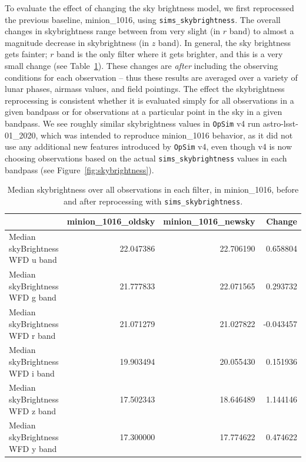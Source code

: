 \documentclass[DM,lsstdraft,authoryear,toc]{lsstdoc}
\newcommand{\opsim}{\texttt{OpSim}\xspace}
\newcommand{\simsky}{\texttt{sims\_skybrightness}\xspace}
\begin{document}

To evaluate the effect of changing the sky brightness model, we first reprocessed the previous baseline, minion\_1016, using \simsky. The overall changes in skybrightness range between from very slight (in $r$ band) to almost a magnitude decrease in skybrightness (in $z$ band). In general, the sky brightness gets fainter; $r$ band is the only filter where it gets brighter, and this is a very small change (see Table~\ref{tab:medskybright}). These changes are {\it after} including the observing conditions for each observation -- thus these results are averaged over a variety of lunar phases, airmass values, and field pointings. The effect the skybrightness reprocessing is consistent whether it is evaluated simply for all observations in a given bandpass or  for observations at a particular point in the sky in a given bandpass. We see roughly similar skybrightness values in \opsim v4 run astro-lsst-01\_2020, which was intended to reproduce minion\_1016 behavior, as it did not use any additional new features introduced by \opsim v4, even though v4 is now choosing observations based on the actual \simsky values in each bandpass (see Figure~\ref{fig:skybrightness}). 

\begin{table}[htp]
\caption{Median skybrightness over all observations in each filter, in minion\_1016, before and after reprocessing with \simsky.}
\begin{center}
\begin{tabular}{lrrr}
{} &  minion\_1016\_oldsky &  minion\_1016\_newsky &    Change \\
\hline
Median skyBrightness WFD u band       &           22.047386 &           22.706190 &  0.658804 \\
Median skyBrightness WFD g band       &           21.777833 &           22.071565 &  0.293732 \\
Median skyBrightness WFD r band       &           21.071279 &           21.027822 & -0.043457 \\
Median skyBrightness WFD i band       &           19.903494 &           20.055430 &  0.151936 \\
Median skyBrightness WFD z band       &           17.502343 &           18.646489 &  1.144146 \\
Median skyBrightness WFD y band       &           17.300000 &           17.774622 &  0.474622 \\
\hline
\end{tabular}
\end{center}
\label{tab:medskybright}
\end{table}
\end{document}
